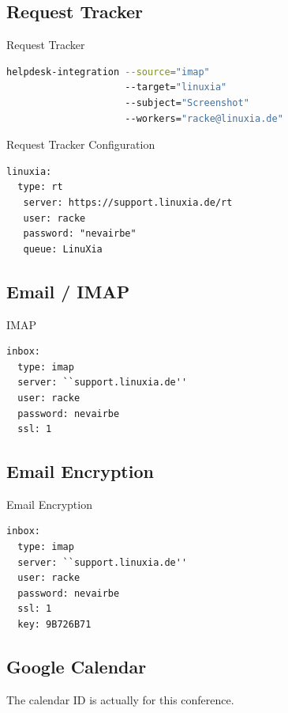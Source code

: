 \subsection{Request Tracker}
\begin{frame}[fragile]{Request Tracker}

\begin{lstlisting}[language=bash]
helpdesk-integration --source="imap" 
                     --target="linuxia" 
                     --subject="Screenshot"
                     --workers="racke@linuxia.de"
\end{lstlisting}
\end{frame}

\begin{frame}[fragile]{Request Tracker Configuration}
\begin{lstlisting}
linuxia:
  type: rt
   server: https://support.linuxia.de/rt
   user: racke
   password: "nevairbe"
   queue: LinuXia
\end{lstlisting}
\end{frame}

\subsection{Email / IMAP}

\begin{frame}[fragile]{IMAP}
\begin{lstlisting}
inbox:
  type: imap
  server: ``support.linuxia.de''
  user: racke
  password: nevairbe
  ssl: 1
\end{lstlisting}
\end{frame}

\subsection{Email Encryption}
\begin{frame}[fragile]{Email Encryption}
\begin{lstlisting}
inbox:
  type: imap
  server: ``support.linuxia.de''
  user: racke
  password: nevairbe
  ssl: 1
  key: 9B726B71
\end{lstlisting}
\end{frame}

\subsection{Google Calendar}

The calendar ID is actually for this conference.

